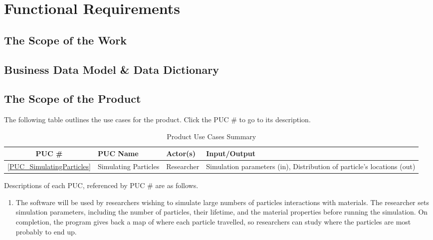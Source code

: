 \documentclass[12pt]{article}
\begin{document}
\section{Functional Requirements}

\subsection{The Scope of the Work} %

\subsection{Business Data Model \& Data Dictionary} %

\subsection{The Scope of the Product}
The following table outlines the use cases for the product. Click the PUC \# to go to its description.

\begin{table}[h]
\centering
\begin{tabularx}{\textwidth}{|c|l|l|X|}
\hline
PUC \# & PUC Name & Actor(s) & Input/Output\\
\hline\hline
\ref{PUC_SimulatingParticles} & Simulating Particles & Researcher & Simulation parameters (in), Distribution of particle's locations (out)\\
\hline
\end{tabularx}
\caption{Product Use Cases Summary}
\end{table}

Descriptions of each PUC, referenced by PUC \# are as follows.
\begin{enumerate}
\item \label{PUC_SimulatingParticles} The software will be used by researchers wishing to simulate large numbers of particles interactions with materials. The researcher sets simulation parameters, including the number of particles, their lifetime, and the material properties before running the simulation. On completion, the program gives back a map of where each particle travelled, so researchers can study where the particles are most probably to end up.
\end{enumerate}
\end{document}
